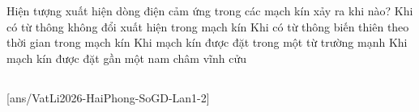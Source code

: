 	\begin{ex}%
		Hiện tượng xuất hiện dòng điện cảm ứng trong các mạch kín xảy ra khi nào?
		\choice
		{Khi có từ thông không đổi xuất hiện trong mạch kín}
		{\True Khi có từ thông biến thiên theo thời gian trong mạch kín}
		{Khi mạch kín được đặt trong một từ trường mạnh}
		{Khi mạch kín được đặt gần một nam châm vĩnh cửu}
	\end{ex}

	\subsection*{}
	\setcounter{ex}{0}
	[ans/VatLi2026-HaiPhong-SoGD-Lan1-2]

